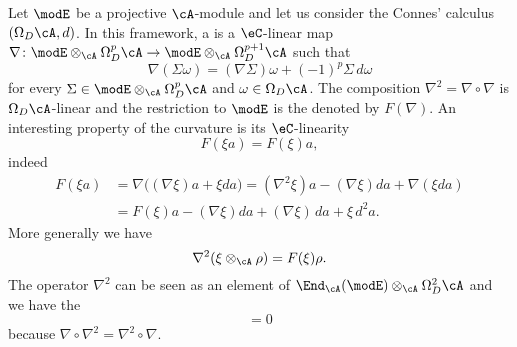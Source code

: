 Let $\modE$ be a projective $\cA$-module and let us consider the Connes' calculus $(\Omega_D\cA,d)$. In this framework, a  is a $\eC$-linear map $\nabla\colon \modE\otimes_{\cA}\Omega_D^p\cA\to \modE\otimes_{\cA}\Omega^{p+1}_D\cA$ such that
\begin{equation}
\nabla(\Sigma\omega)=(\nabla\Sigma)\omega+(-1)^p\Sigma\,d\omega
\end{equation}
for every $\Sigma\in\modE\otimes_{\cA}\Omega^p_D\cA$ and $\omega\in\Omega_D\cA$. The composition $\nabla^2=\nabla\circ\nabla$ is $\Omega_D\cA$-linear and the restriction to $\modE$ is the  denoted by $F(\nabla)$. An interesting property of the curvature is its $\eC$-linearity
\begin{equation}
  F(\xi a)=F(\xi)a,
\end{equation}
indeed
\begin{align*}
F(\xi a)	&=\nabla\big( (\nabla\xi)a+\xi da \big)=(\nabla^2\xi)a-(\nabla\xi)da+\nabla(\xi da)\\
		&=F(\xi)a-(\nabla\xi)da+(\nabla\xi)\,da+\xi\,d^2a.
\end{align*}
More generally we have
\begin{equation}
\nabla^2(\xi\otimes_{\cA}\rho)=F(\xi)\rho.
\end{equation}
The operator $\nabla^2$ can be seen as an element of $\End_{\cA}(\modE)\otimes_{\cA}\Omega^2_D\cA$ and we have the 
\begin{equation}
[\nabla,F]=0
\end{equation}
because $\nabla\circ\nabla^2=\nabla^2\circ\nabla$.

